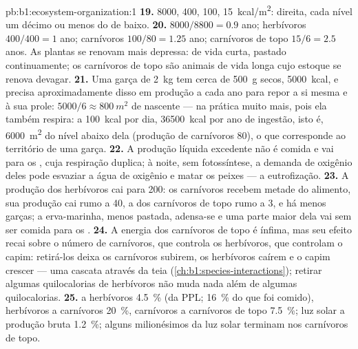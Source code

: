 \begin{solution}{pb:b1:ecosystem-organization:1}
\textbf{19.} \qty{8000}{}, \qty{400}{}, \qty{100}{}, \qty{15}{kcal/m^2}:
direita, cada nível um décimo ou menos do de baixo.
\textbf{20.}  $8000/8800 = 0.9$ ano; herbívoros $400/400 =
1$ ano; carnívoros $100/80 = 1.25$ ano; carnívoros de topo $15/6 =
2.5$ anos. As plantas se renovam mais depressa:  de vida curta,
pastado continuamente; os carnívoros de topo são animais de vida longa
cujo estoque se renova devagar.
\textbf{21.} Uma garça de \qty{2}{kg} tem cerca de \qty{500}{g} secos,
\qty{5000}{kcal}, e precisa aproximadamente disso em produção a cada
ano para repor a si mesma e à sua prole: $5000/6 \approx \qty{800}{m^2}$
de nascente --- na prática muito mais, pois ela também respira: a
\qty{100}{kcal} por dia, \qty{36500}{kcal} por ano de ingestão, isto
é, \qty{6000}{m^2} do nível abaixo dela (produção de carnívoros
\qty{80}{}), o que corresponde ao território de uma garça.
\textbf{22.} A produção líquida excedente não é comida e vai para os
, cuja respiração duplica; à noite, sem fotossíntese, a
demanda de oxigênio deles pode esvaziar a água de oxigênio e matar os
peixes --- a eutrofização.
\textbf{23.} A produção dos herbívoros cai para \qty{200}{}: os
carnívoros recebem metade do alimento, sua produção cai rumo a
\qty{40}{}, a dos carnívoros de topo rumo a 3, e há menos garças; a
erva-marinha, menos pastada, adensa-se e uma parte maior dela vai sem
ser comida para os .
\textbf{24.} A energia dos carnívoros de topo é ínfima, mas seu efeito
recai sobre o número de carnívoros, que controla os herbívoros, que
controlam o capim: retirá-los deixa os carnívoros subirem, os
herbívoros caírem e o capim crescer --- uma cascata através da teia
(\cref{ch:b1:species-interactions}); retirar algumas quilocalorias de
herbívoros não muda nada além de algumas quilocalorias.
\textbf{25.}  a herbívoros \qty{4.5}{\%} (da PPL;
\qty{16}{\%} do que foi comido), herbívoros a carnívoros \qty{20}{\%},
carnívoros a carnívoros de topo \qty{7.5}{\%}; luz solar a produção
bruta \qty{1.2}{\%}; alguns milionésimos da luz solar terminam nos
carnívoros de topo.
\end{solution}
